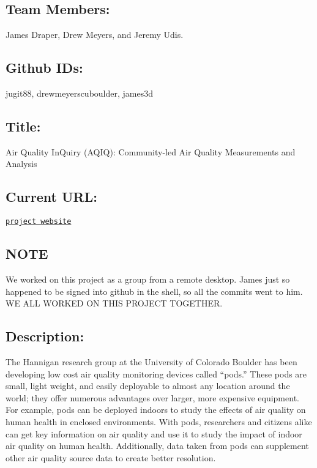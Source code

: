 \subsection*{Team Members\+:}

James Draper, Drew Meyers, and Jeremy Udis. \subsection*{Github ID\textquotesingle{}s\+:}

jugit88, drewmeyerscuboulder, james3d

\subsection*{Title\+:}

Air Quality In\+Quiry (A\+Q\+IQ)\+: Community-\/led Air Quality Measurements and Analysis

\subsection*{Current U\+RL\+:}

\href{http://ec2-52-26-114-13.us-west-2.compute.amazonaws.com/login-site/login.php}{\tt project website}

\subsection*{N\+O\+TE}

We worked on this project as a group from a remote desktop. James just so happened to be signed into github in the shell, so all the commits went to him. WE A\+LL W\+O\+R\+K\+ED ON T\+H\+IS P\+R\+O\+J\+E\+CT T\+O\+G\+E\+T\+H\+ER. \subsection*{Description\+:}

The Hannigan research group at the University of Colorado Boulder has been developing low cost air quality monitoring devices called “pods.\+” These pods are small, light weight, and easily deployable to almost any location around the world; they offer numerous advantages over larger, more expensive equipment. For example, pods can be deployed indoors to study the effects of air quality on human health in enclosed environments. With pods, researchers and citizens alike can get key information on air quality and use it to study the impact of indoor air quality on human health. Additionally, data taken from pods can supplement other air quality source data to create better resolution.

